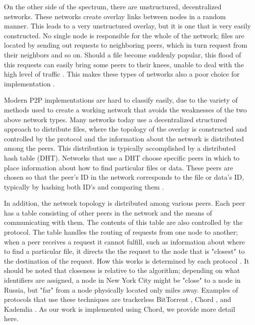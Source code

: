 \documentclass[10pt, conference, compsocconf, letterpaper]{IEEEtran}
\begin{document}
On the other side of the spectrum, there are unstructured, decentralized networks.  These networks create overlay links between nodes in a random manner. This leads to a very unstructured overlay, but it is one that is very easily constructed.  No single node is responsible for the whole of the network;  files are located by sending out requests to neighboring peers, which in turn request from their neighbors and so on. Should a file become suddenly popular, this flood of this requests can easily bring some peers to their knees, unable to deal with the high level of traffic \cite{Lv:2002:SRU:514191.514206}.  This makes these types of networks also a poor choice for implementation \cite{Overview}.

Modern P2P implementations are hard to classify easily, due to the variety of methods used to create a working network that avoids the weaknesses of the two above network types.  Many networks today use a decentralized structured approach to distribute files, where the topology of the overlay is constructed and controlled by the protocol and the information about the network is distributed among the peers.  This distribution is typically accomplished by a distributed hash table (DHT).  Networks that use a DHT choose specific peers in which to place information about how to find particular files or data.  These peers are chosen so that the peer's ID in the network corresponds to the file or data's ID, typically by hashing both ID's and comparing them  \cite{SurveyCompare}. 

In addition, the network topology is distributed among various peers.  Each peer has a table consisting of other peers in the network and the means of communicating with them.  The contents of this table are also controlled by the protocol.  The table handles the routing of requests from one node to another; when a peer receives a request it cannot fulfill, such as information about where to find a particular file, it directs the the request to the node that is "closest" to the destination of the request. How this works is determined by each protocol \cite{Chord}.  It should be noted that closeness is relative to the algorithm; depending on what identifiers are assigned, a node in New York City might be "close" to a node in Russia, but "far" from a node physically located only miles away.  Examples of protocols that use these techniques are trackerless BitTorrent \cite{BitTorrent}, Chord \cite{Chord}, and Kademlia \cite{Kademlia}. As our work is implemented using Chord, we provide more detail here. 
\end{document}
